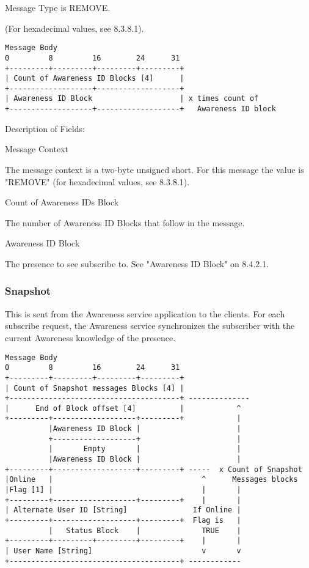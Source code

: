 \documentclass[titlepage,oneside]{book}
\begin{document}
\par{} Message Type is REMOVE.

\subpar{}  (For hexadecimal values, see 8.3.8.1).

\begin{verbatim}
Message Body
0         8         16        24      31
+---------+---------+---------+---------+
| Count of Awareness ID Blocks [4]      |
+-------------------+-------------------+
| Awareness ID Block                    | x times count of
+-------------------+-------------------+   Awareness ID block
\end{verbatim}

\par{} Description of Fields:

\par{} Message Context

\subpar{}  The message context is a two-byte unsigned short. For this message 
  the value is "REMOVE" (for hexadecimal values, see 
  8.3.8.1).

\par{} Count of Awareness IDs Block

\subpar{}  The number of Awareness ID Blocks that follow in the message.

\par{} Awareness ID Block

\subpar{}  The presence to see subscribe to. See "Awareness ID Block" on
  8.4.2.1.

\subsubsection{Snapshot}

\par{} This is sent from the Awareness service application to the clients.
For each subscribe request, the Awareness service synchronizes the
subscriber with the current Awareness knowledge of the presence.

\begin{verbatim}
Message Body
0         8         16        24      31
+---------+---------+---------+---------+
| Count of Snapshot messages Blocks [4] |
+---------------------------------------+ --------------
|      End of Block offset [4]          |            ^
+---------+-------------------+---------+            |
          |Awareness ID Block |                      |
          +-------------------+                      |
          |       Empty       |                      |
          |Awareness ID Block |                      |
+---------+-------------------+---------+ -----  x Count of Snapshot
|Online   |                                  ^      Messages blocks
|Flag [1] |                                  |       |
+---------+-------------------+---------+    |       |
| Alternate User ID [String]               If Online |
+---------+-------------------+---------+  Flag is   |
          |   Status Block    |              TRUE    |
+---------+---------+---------+---------+    |       |
| User Name [String]                         v       v
+---------------------------------------+ ------------
\end{verbatim}
\end{document}
